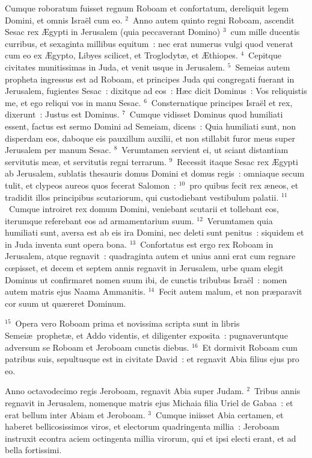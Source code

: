 \lettrine[lines=10,image=true,loversize=0.05,lraise=-0.03]{C}{}umque roboratum fuisset regnum Roboam et confortatum, dereliquit legem Domini, et omnis Isra\"el cum eo.
${}^{2}$~Anno autem quinto regni Roboam, ascendit Sesac rex \AE gypti in Jerusalem (quia peccaverant Domino)
${}^{3}$~cum mille ducentis curribus, et sexaginta millibus equitum~: nec erat numerus vulgi quod venerat cum eo ex \AE gypto, Libyes scilicet, et Troglodyt\ae , et \AE thiopes.
${}^{4}$~Cepitque civitates munitissimas in Juda, et venit usque in Jerusalem.
${}^{5}$~Semeias autem propheta ingressus est ad Roboam, et principes Juda qui congregati fuerant in Jerusalem, fugientes Sesac~: dixitque ad eos~: H\ae c dicit Dominus~: Vos reliquistis me, et ego reliqui vos in manu Sesac.
${}^{6}$~Consternatique principes Isra\"el et rex, dixerunt~: Justus est Dominus.
${}^{7}$~Cumque vidisset Dominus quod humiliati essent, factus est sermo Domini ad Semeiam, dicens~: Quia humiliati sunt, non disperdam eos, daboque eis pauxillum auxilii, et non stillabit furor meus super Jerusalem per manum Sesac.
${}^{8}$~Verumtamen servient ei, ut sciant distantiam servitutis me\ae , et servitutis regni terrarum.
${}^{9}$~Recessit itaque Sesac rex \AE gypti ab Jerusalem, sublatis thesauris domus Domini et domus regis~: omniaque secum tulit, et clypeos aureos quos fecerat Salomon~:
${}^{10}$~pro quibus fecit rex \ae neos, et tradidit illos principibus scutariorum, qui custodiebant vestibulum palatii.
${}^{11}$~Cumque introiret rex domum Domini, veniebant scutarii et tollebant eos, iterumque referebant eos ad armamentarium suum.
${}^{12}$~Verumtamen quia humiliati sunt, aversa est ab eis ira Domini, nec deleti sunt penitus~: siquidem et in Juda inventa sunt opera bona.
${}^{13}$~Confortatus est ergo rex Roboam in Jerusalem, atque regnavit~: quadraginta autem et unius anni erat cum regnare cœpisset, et decem et septem annis regnavit in Jerusalem, urbe quam elegit Dominus ut confirmaret nomen suum ibi, de cunctis tribubus Isra\"el~: nomen autem matris ejus Naama Ammanitis.
${}^{14}$~Fecit autem malum, et non pr\ae paravit cor suum ut qu\ae reret Dominum.


${}^{15}$~Opera vero Roboam prima et novissima scripta sunt in libris Semei\ae\ prophet\ae , et Addo videntis, et diligenter exposita~: pugnaveruntque adversum se Roboam et Jeroboam cunctis diebus.
${}^{16}$~Et dormivit Roboam cum patribus suis, sepultusque est in civitate David~: et regnavit Abia filius ejus pro eo.

\lettrine[lines=10,image=true,loversize=0.05,lraise=-0.03]{A}{}nno octavodecimo regis Jeroboam, regnavit Abia super Judam.
${}^{2}$~Tribus annis regnavit in Jerusalem, nomenque matris ejus Michaia filia Uriel de Gabaa~: et erat bellum inter Abiam et Jeroboam.
${}^{3}$~Cumque iniisset Abia certamen, et haberet bellicosissimos viros, et electorum quadringenta millia~: Jeroboam instruxit econtra aciem octingenta millia virorum, qui et ipsi electi erant, et ad bella fortissimi.


